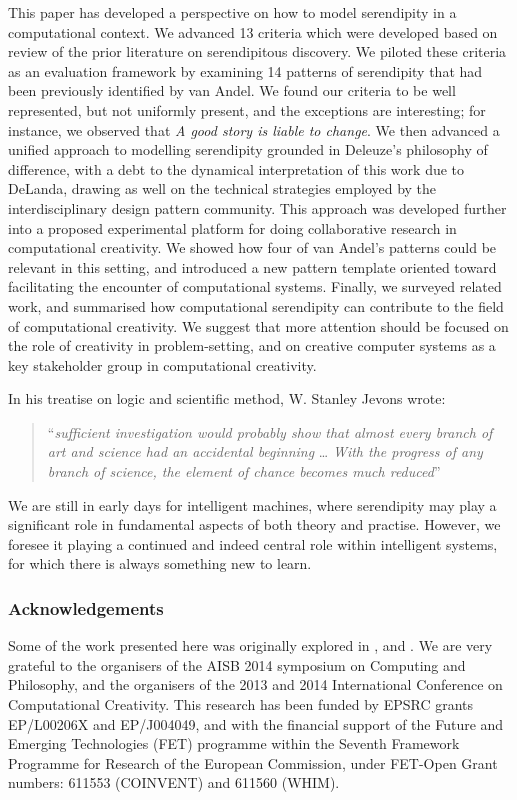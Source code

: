 \documentclass{llncs}
\begin{document}
This paper has developed a perspective on how to model serendipity in
a computational context.  We advanced 13 criteria which were developed
based on review of the prior literature on serendipitous discovery.
We piloted these criteria as an evaluation framework by examining 14
patterns of serendipity that had been previously identified by van
Andel.  We found our criteria to be well represented, but not
uniformly present, and the exceptions are interesting; for instance,
we observed that \emph{A good story is liable to change}.  We then
advanced a unified approach to modelling serendipity grounded in
Deleuze's philosophy of difference, with a debt to the dynamical
interpretation of this work due to DeLanda, drawing as well on the
technical strategies employed by the interdisciplinary design pattern
community.  This approach was developed further into a proposed
experimental platform for doing collaborative research in
computational creativity.  We showed how four of van Andel's patterns
could be relevant in this setting, and introduced a new pattern
template oriented toward facilitating the encounter of computational
systems.
%
Finally, we surveyed related work, and summarised how computational
serendipity can contribute to the field of computational creativity.
We suggest that more attention should be focused on the role of
creativity in problem-setting, and on creative computer systems as a
key stakeholder group in computational creativity.  

In his treatise on logic and scientific method, W. Stanley Jevons
wrote:
\begin{quote}
``\emph{sufficient investigation would probably show that almost every
    branch of art and science had an accidental beginning} \ldots
  \emph{With the progress of any branch of science, the element of
    chance becomes much reduced}'' \cite[p. 531]{jevons:1877}
\end{quote}
We are still in early days for intelligent machines, where serendipity
may play a significant role in fundamental aspects of both theory and
practise.  However, we foresee it playing a continued and indeed
central role within intelligent systems, for which there is always
something new to learn.

\subsubsection*{Acknowledgements}
Some of the work presented here was originally explored in
\cite{colton2014acid}, \cite{colton-assessingprogress} and
\cite{pease2013discussion}.  We are very grateful to the organisers of
the AISB 2014 symposium on Computing and Philosophy, and the
organisers of the 2013 and 2014 International Conference on
Computational Creativity.  This research has been funded by EPSRC
grants EP/L00206X and EP/J004049, and with the financial support of
the Future and Emerging Technologies (FET) programme within the
Seventh Framework Programme for Research of the European Commission,
under FET-Open Grant numbers: 611553 (COINVENT) and 611560 (WHIM).
\end{document}
